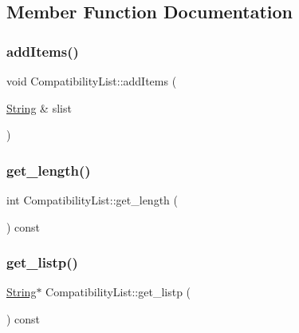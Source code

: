 \subsection{Member Function Documentation}
\mbox{\label{class_compatibility_list_a7d9dbeada758ed1fc4849d77058ff69d}} 
\subsubsection{\texorpdfstring{addItems()}{addItems()}}
{\footnotesize\ttfamily void Compatibility\+List\+::add\+Items (\begin{DoxyParamCaption}\item[{\mbox{\hyperlink{class_string}{String}} \&}]{slist }\end{DoxyParamCaption})}

\mbox{\label{class_compatibility_list_a44d0f7533b66ced7a957f2846e76c4ec}} 
\subsubsection{\texorpdfstring{get\_length()}{get\_length()}}
{\footnotesize\ttfamily int Compatibility\+List\+::get\+\_\+length (\begin{DoxyParamCaption}{ }\end{DoxyParamCaption}) const\hspace{0.3cm}{\ttfamily [inline]}}

\mbox{\label{class_compatibility_list_a16642e17369c398c67b04f549f2f77ac}} 
\subsubsection{\texorpdfstring{get\_listp()}{get\_listp()}}
{\footnotesize\ttfamily \mbox{\hyperlink{class_string}{String}}$\ast$ Compatibility\+List\+::get\+\_\+listp (\begin{DoxyParamCaption}{ }\end{DoxyParamCaption}) const\hspace{0.3cm}{\ttfamily [inline]}}


